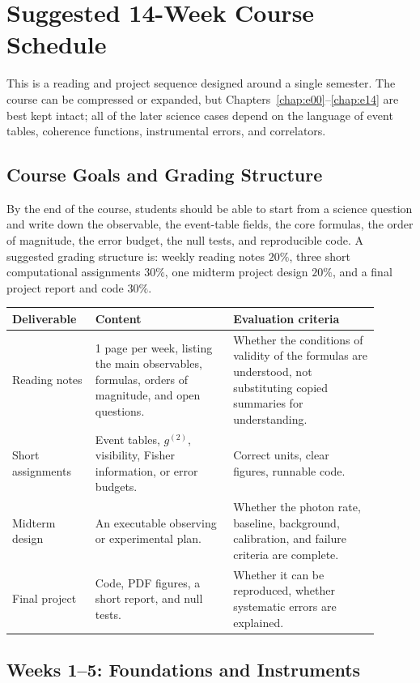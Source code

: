 \chapter{Suggested 14-Week Course Schedule}
\label{app:f}

This is a reading and project sequence designed around a single semester. The course can be compressed or expanded, but Chapters~\ref{chap:e00}--\ref{chap:e14} are best kept intact; all of the later science cases depend on the language of event tables, coherence functions, instrumental errors, and correlators.

\section{Course Goals and Grading Structure}
\label{appsec:f-goals}

By the end of the course, students should be able to start from a science question and write down the observable, the event-table fields, the core formulas, the order of magnitude, the error budget, the null tests, and reproducible code. A suggested grading structure is: weekly reading notes \(20\%\), three short computational assignments \(30\%\), one midterm project design \(20\%\), and a final project report and code \(30\%\).

\begin{longtable}{p{0.20\linewidth}p{0.34\linewidth}p{0.36\linewidth}}
\toprule
Deliverable & Content & Evaluation criteria \\
\midrule
Reading notes & 1 page per week, listing the main observables, formulas, orders of magnitude, and open questions. & Whether the conditions of validity of the formulas are understood, not substituting copied summaries for understanding. \\
Short assignments & Event tables, \(g^{(2)}\), visibility, Fisher information, or error budgets. & Correct units, clear figures, runnable code. \\
Midterm design & An executable observing or experimental plan. & Whether the photon rate, baseline, background, calibration, and failure criteria are complete. \\
Final project & Code, PDF figures, a short report, and null tests. & Whether it can be reproduced, whether systematic errors are explained. \\
\bottomrule
\end{longtable}

\section{Weeks 1--5: Foundations and Instruments}
\label{appsec:f-foundation}

